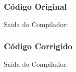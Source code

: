 \subsubsection{Código Original}


Saida do Compilador:




\subsubsection{Código Corrigido}


Saida do Compilador:


